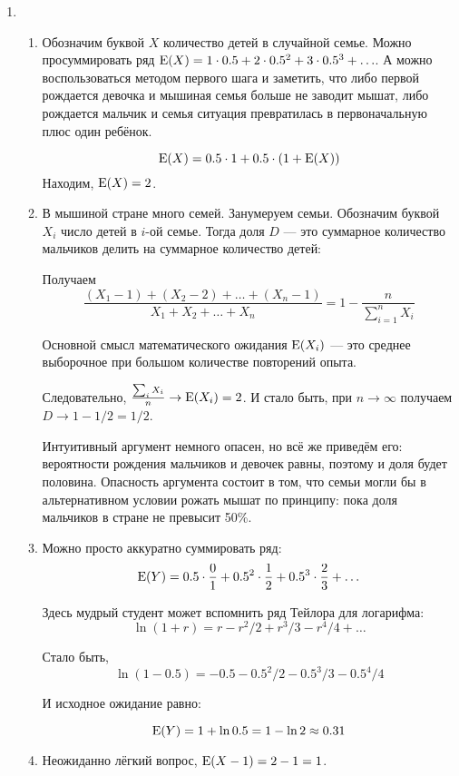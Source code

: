\begin{enumerate}
\item
\begin{enumerate}
  \item Обозначим буквой $X$ количество детей в случайной семье.
  Можно просуммировать ряд $\operatorname{E}(X) = 1\cdot 0.5 + 2\cdot 0.5^2 + 3\cdot 0.5^3 + \ldots$. 
  А можно воспользоваться методом первого шага и заметить, что либо первой рождается девочка 
  и мышиная семья больше не заводит мышат, либо рождается мальчик и семья ситуация превратилась в первоначальную
  плюс один ребёнок.

  \[
  \operatorname{E}(X) = 0.5 \cdot 1 + 0.5 \cdot (1 + \operatorname{E}(X))  
  \]
  Находим, $\operatorname{E}(X)=2$.
  \item В мышиной стране много семей. Занумеруем семьи. Обозначим буквой $X_i$ число детей в $i$-ой семье.
  Тогда доля $D$ — это суммарное количество мальчиков делить на суммарное количество детей:

  Получаем
  \[
  \frac{(X_1 - 1) + (X_2 - 2)+ \ldots + (X_n - 1)}{X_1 + X_2 + \ldots +X_n} = 1 - \frac{n}{\sum_{i=1}^n X_i}  
  \]

  Основной смысл математического ожидания $\operatorname{E}(X_i)$ — это среднее выборочное при большом количестве повторений опыта.

  Следовательно, $\frac{\sum_i X_i}{n} \to \operatorname{E}(X_i)=2$. И стало быть, при $n\to\infty$ получаем $D \to 1 - 1/2=1/2$.

  Интуитивный аргумент немного опасен, но всё же приведём его: вероятности рождения мальчиков и девочек равны,
  поэтому и доля будет половина. 
  Опасность аргумента состоит в том, что семьи могли бы в альтернативном условии рожать мышат по принципу: 
  пока доля мальчиков в стране не превысит 50\%. 

  \item Можно просто аккуратно суммировать ряд:
  \[
  \operatorname{E}(Y) = 0.5 \cdot \frac{0}{1} + 0.5^2 \cdot \frac{1}{2} + 0.5^3 \cdot \frac{2}{3} + \ldots
  \]

  Здесь мудрый студент может вспомнить ряд Тейлора для логарифма:
  \[
  \ln (1 + r) = r - r^2/2 + r^3/3 - r^4/4 +\ldots
  \]

  Стало быть,
  \[
  \ln (1 - 0.5) = -0.5 - 0.5^2/2 - 0.5^3/3 - 0.5^4/4  
  \]

  И исходное ожидание равно:

  \[
  \operatorname{E}(Y) = 1 + \ln 0.5 = 1 - \ln 2 \approx 0.31  
  \]

\item Неожиданно лёгкий вопрос, $\operatorname{E}(X - 1) = 2 -1=1$.
\end{enumerate}



\end{enumerate}
